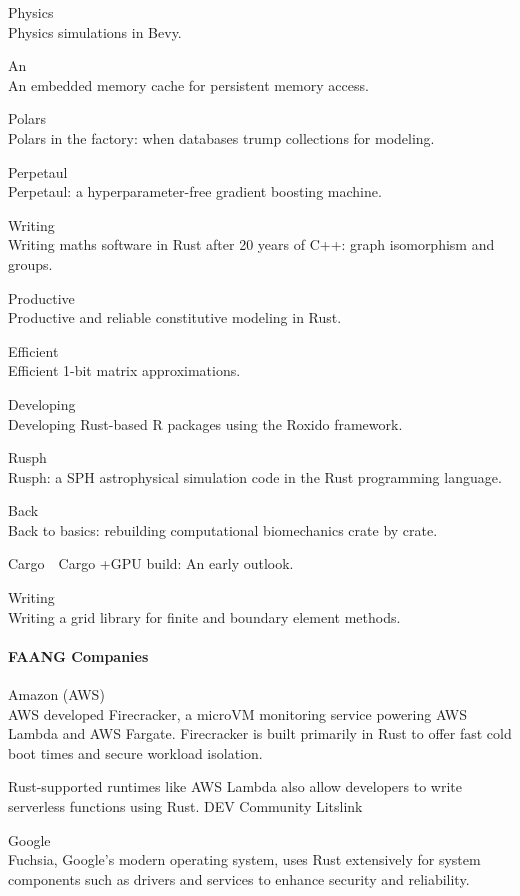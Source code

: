 \documentclass{article}
\begin{document}
Physics\\
Physics simulations in Bevy.

An\\
An embedded memory cache for persistent memory access.

Polars\\
Polars in the factory: when databases trump collections for modeling.

Perpetaul\\
Perpetaul: a hyperparameter-free gradient boosting machine.

Writing\\
Writing maths software in Rust after 20 years of C++: graph isomorphism and groups.

Productive\\
Productive and reliable constitutive modeling in Rust.

Efficient\\
Efficient 1-bit matrix approximations.

Developing\\
Developing Rust-based R packages using the Roxido framework.

Rusph\\
Rusph: a SPH astrophysical simulation code in the Rust programming language.

Back\\
Back to basics: rebuilding computational biomechanics crate by crate.

Cargo\ \ Cargo +GPU build: An early outlook.

Writing\\
Writing a grid library for finite and boundary element methods.

\paragraph{FAANG Companies}

Amazon (AWS)\\
AWS developed Firecracker, a microVM monitoring service powering AWS Lambda and AWS Fargate.
Firecracker is built primarily in Rust to offer fast cold boot times and secure workload isolation.

Rust-supported runtimes like AWS Lambda also allow developers to write serverless functions using
Rust. DEV Community Litslink

Google\\
Fuchsia, Google's modern operating system, uses Rust extensively for system components such as
drivers and services to enhance security and reliability.
\end{document}
